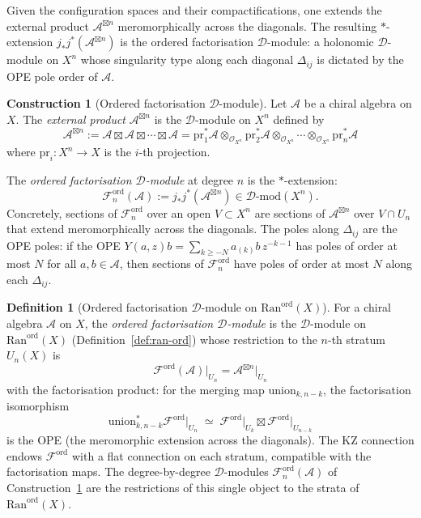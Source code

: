 \documentclass[11pt,reqno]{amsart}
\theoremstyle{definition}
\newtheorem{definition}[theorem]{Definition}
\newtheorem{construction}[theorem]{Construction}
\theoremstyle{remark}
\newcommand{\cA}{\mathcal{A}}
\newcommand{\cD}{\mathcal{D}}
\newcommand{\cF}{\mathcal{F}}
\newcommand{\cO}{\mathcal{O}}
\newcommand{\Ran}{\mathrm{Ran}}
\numberwithin{equation}{section}
\begin{document}
Given the configuration spaces and their compactifications,
one extends the external product $\cA^{\boxtimes n}$
meromorphically across the diagonals. The resulting
$*$-extension $j_* j^* (\cA^{\boxtimes n})$ is the ordered
factorisation $\cD$-module: a holonomic $\cD$-module on
$X^n$ whose singularity type along each diagonal $\Delta_{ij}$
is dictated by the OPE pole order of $\cA$.

\begin{construction}[Ordered factorisation $\cD$-module]
\label{constr:fact-dmod}
Let $\cA$ be a chiral algebra on $X$.
The \emph{external product} $\cA^{\boxtimes n}$ is the
$\cD$-module on $X^n$ defined by
\begin{equation}\label{eq:external-prod}
  \cA^{\boxtimes n}
  := \cA \boxtimes \cA \boxtimes \cdots \boxtimes \cA
  = \mathrm{pr}_1^* \cA \otimes_{\cO_{X^n}}
    \mathrm{pr}_2^* \cA \otimes_{\cO_{X^n}} \cdots
    \otimes_{\cO_{X^n}} \mathrm{pr}_n^* \cA
\end{equation}
where $\mathrm{pr}_i \colon X^n \to X$ is the
$i$-th projection.

The \emph{ordered factorisation $\cD$-module} at degree $n$
is the $*$-extension:
\begin{equation}\label{eq:fact-dmod-def}
  \cF_n^{\mathrm{ord}}(\cA)
  := j_* j^* (\cA^{\boxtimes n})
  \in \cD\text{-}\mathrm{mod}(X^n).
\end{equation}
Concretely, sections of $\cF_n^{\mathrm{ord}}$ over an
open $V \subset X^n$ are sections of $\cA^{\boxtimes n}$
over $V \cap U_n$ that extend meromorphically across the
diagonals.  The poles along $\Delta_{ij}$ are the OPE poles:
if the OPE $Y(a, z) b = \sum_{k \geq -N} a_{(k)} b \,
z^{-k-1}$ has poles of order at most $N$ for all
$a, b \in \cA$, then sections of $\cF_n^{\mathrm{ord}}$
have poles of order at most $N$ along each $\Delta_{ij}$.
\end{construction}

\begin{definition}[Ordered factorisation $\cD$-module
on $\Ran^{\mathrm{ord}}(X)$]
\label{def:fact-dmod-ran}
For a chiral algebra $\cA$ on $X$, the \emph{ordered
factorisation $\cD$-module} is the $\cD$-module on
$\Ran^{\mathrm{ord}}(X)$
(Definition~\ref{def:ran-ord}) whose restriction to the
$n$-th stratum $U_n(X)$ is
\[
  \cF^{\mathrm{ord}}(\cA)\big|_{U_n}
  = \cA^{\boxtimes n}\big|_{U_n}
\]
with the factorisation product: for the merging map
$\mathrm{union}_{k,n-k}$, the factorisation isomorphism
\[
  \mathrm{union}_{k,n-k}^* \cF^{\mathrm{ord}}\big|_{U_n}
  \;\simeq\;
  \cF^{\mathrm{ord}}\big|_{U_k}
  \boxtimes
  \cF^{\mathrm{ord}}\big|_{U_{n-k}}
\]
is the OPE (the meromorphic extension across the diagonals).
The KZ connection endows $\cF^{\mathrm{ord}}$ with a flat
connection on each stratum, compatible with the factorisation
maps. The degree-by-degree $\cD$-modules
$\cF_n^{\mathrm{ord}}(\cA)$ of
Construction~\ref{constr:fact-dmod} are the restrictions
of this single object to the strata of
$\Ran^{\mathrm{ord}}(X)$.
\end{definition}
\end{document}
